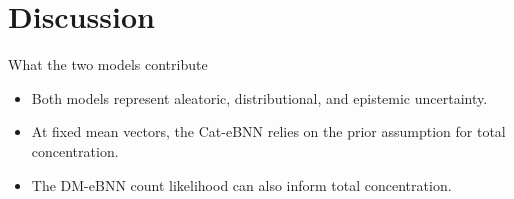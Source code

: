 \section{Discussion}

\begin{frame}{What the two models contribute}
\label{frm:discussion}
\begin{itemize}
\setlength{\itemsep}{5mm}
\item Both models represent aleatoric, distributional, and epistemic uncertainty.
\item At fixed mean vectors, the Cat-eBNN relies on the prior assumption for total concentration.
\item The DM-eBNN count likelihood can also inform total concentration.
\end{itemize}
\medskip
{}
\end{frame}
